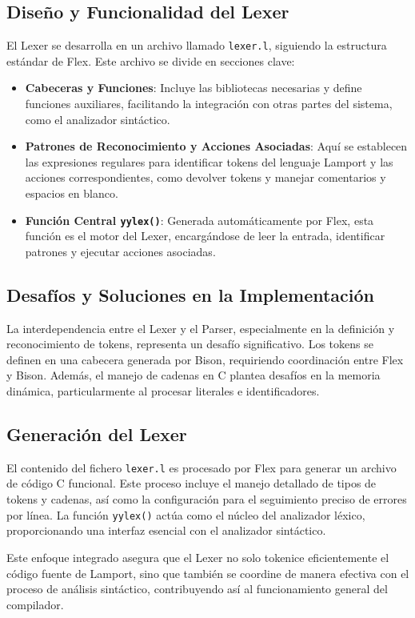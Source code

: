 \subsection{Diseño y Funcionalidad del Lexer}
El Lexer se desarrolla en un archivo llamado \texttt{lexer.l}, siguiendo la estructura estándar de Flex. Este archivo se divide en secciones clave:

\begin{itemize}
    \item \textbf{Cabeceras y Funciones}: Incluye las bibliotecas necesarias y define funciones auxiliares, facilitando la integración con otras partes del sistema, como el analizador sintáctico.
    \item \textbf{Patrones de Reconocimiento y Acciones Asociadas}: Aquí se establecen las expresiones regulares para identificar tokens del lenguaje Lamport y las acciones correspondientes, como devolver tokens y manejar comentarios y espacios en blanco.
    \item \textbf{Función Central \texttt{yylex()}}: Generada automáticamente por Flex, esta función es el motor del Lexer, encargándose de leer la entrada, identificar patrones y ejecutar acciones asociadas.
\end{itemize}

\subsection{Desafíos y Soluciones en la Implementación}
La interdependencia entre el Lexer y el Parser, especialmente en la definición y reconocimiento de tokens, representa un desafío significativo. Los tokens se definen en una cabecera generada por Bison, requiriendo coordinación entre Flex y Bison. Además, el manejo de cadenas en C plantea desafíos en la memoria dinámica, particularmente al procesar literales e identificadores.

\subsection{Generación del Lexer}
El contenido del fichero \texttt{lexer.l} es procesado por Flex para generar un archivo de código C funcional. Este proceso incluye el manejo detallado de tipos de tokens y cadenas, así como la configuración para el seguimiento preciso de errores por línea. La función \texttt{yylex()} actúa como el núcleo del analizador léxico, proporcionando una interfaz esencial con el analizador sintáctico.

Este enfoque integrado asegura que el Lexer no solo tokenice eficientemente el código fuente de Lamport, sino que también se coordine de manera efectiva con el proceso de análisis sintáctico, contribuyendo así al funcionamiento general del compilador.
